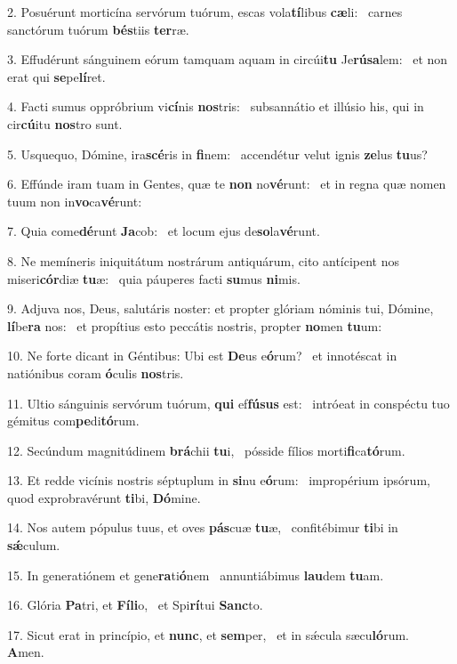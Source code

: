 2. Posuérunt morticína servórum tuórum, escas vola\textbf{tí}libus \textbf{cæ}li: \ast\  carnes sanctórum tuórum \textbf{bés}tiis \textbf{ter}ræ.\

3. Effudérunt sánguinem eórum tamquam aquam in circúi\textbf{tu} Je\textbf{rú}\textbf{sa}lem: \ast\  et non erat qui \textbf{se}pe\textbf{lí}ret.\

4. Facti sumus oppróbrium vi\textbf{cí}nis \textbf{nos}tris: \ast\  subsannátio et illúsio his, qui in cir\textbf{cú}itu \textbf{nos}tro sunt.\

5. Usquequo, Dómine, ira\textbf{scé}ris in \textbf{fi}nem: \ast\  accendétur velut ignis \textbf{ze}lus \textbf{tu}us?\

6. Effúnde iram tuam in Gentes, quæ te \textbf{non} no\textbf{vé}runt: \ast\  et in regna quæ nomen tuum non in\textbf{vo}ca\textbf{vé}runt:\

7. Quia come\textbf{dé}runt \textbf{Ja}cob: \ast\  et locum ejus de\textbf{so}la\textbf{vé}runt.\

8. Ne memíneris iniquitátum nostrárum antiquárum, cito antícipent nos miseri\textbf{cór}diæ \textbf{tu}æ: \ast\  quia páuperes facti \textbf{su}mus \textbf{ni}mis.\

9. Adjuva nos, Deus, salutáris noster: et propter glóriam nóminis tui, Dómine, \textbf{lí}be\textbf{ra} nos: \ast\  et propítius esto peccátis nostris, propter \textbf{no}men \textbf{tu}um:\

10. Ne forte dicant in Géntibus: Ubi est \textbf{De}us e\textbf{ó}rum? \ast\  et innotéscat in natiónibus coram \textbf{ó}culis \textbf{nos}tris.\

11. Ultio sánguinis servórum tuórum, \textbf{qui} ef\textbf{fú}\textbf{sus} est: \ast\  intróeat in conspéctu tuo gémitus com\textbf{pe}di\textbf{tó}rum.\

12. Secúndum magnitúdinem \textbf{brá}chii \textbf{tu}i, \ast\  pósside fílios morti\textbf{fi}ca\textbf{tó}rum.\

13. Et redde vicínis nostris séptuplum in \textbf{si}nu e\textbf{ó}rum: \ast\  impropérium ipsórum, quod exprobravérunt \textbf{ti}bi, \textbf{Dó}mine.\

14. Nos autem pópulus tuus, et oves \textbf{pás}cuæ \textbf{tu}æ, \ast\  confitébimur \textbf{ti}bi in \textbf{sǽ}culum.\

15. In generatiónem et gene\textbf{ra}ti\textbf{ó}nem \ast\  annuntiábimus \textbf{lau}dem \textbf{tu}am.\

16. Glória \textbf{Pa}tri, et \textbf{Fí}\textbf{li}o, \ast\  et Spi\textbf{rí}tui \textbf{Sanc}to.\

17. Sicut erat in princípio, et \textbf{nunc}, et \textbf{sem}per, \ast\  et in sǽcula sæcu\textbf{ló}rum. \textbf{A}men.\

